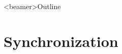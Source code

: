 \documentclass[compress,red]{beamer}
\begin{document}
\begin{frame}<beamer>{Outline}

    \tableofcontents %

\end{frame}
\section{Synchronization}
\end{document}
